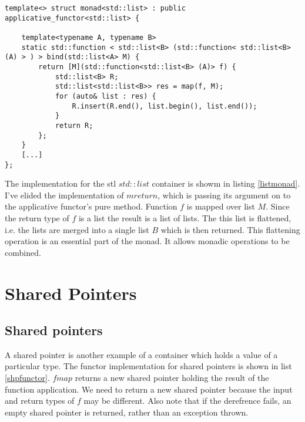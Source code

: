 \documentclass[12pt,fleqn]{article}
\begin{document}
  
%
%
%
\begin{minipage}{\linewidth}
\begin{lstlisting}[caption=monad for std::list, label=listmonad]
template<> struct monad<std::list> : public applicative_functor<std::list> {

	template<typename A, typename B>
	static std::function < std::list<B> (std::function< std::list<B> (A) > ) > bind(std::list<A> M) {
		return [M](std::function<std::list<B> (A)> f) {
			std::list<B> R;
			std::list<std::list<B>> res = map(f, M);
			for (auto& list : res) {
				R.insert(R.end(), list.begin(), list.end());
			}
			return R;
		};
	}
    [...]
};
\end{lstlisting}
\end{minipage}
%
%
%
The implementation for the stl $std::list$ container is showm in listing \ref{listmonad}.
I've elided the implementation of $mreturn$, which is passing its argument on to the applicative functor's pure method.
Function $f$ is mapped over list $M$. Since the return type of $f$ is a list the result is a list of lists.
The this list is flattened, i.e. the lists are merged into a single list $B$ which is then returned.
This flattening operation is an essential part of the monad. It allows monadic operations to be combined.

\section{Shared Pointers}

  

\subsection{Shared pointers}
%
%
%

A shared pointer is another example of a container which holds a value of a particular type.
The functor implementation for shared pointers is shown in list \ref{shpfunctor}. 
$fmap$ returns a new shared pointer holding the result of the function application.
We need to return a new shared pointer because the input and return types of $f$ may be different. 
Also note that if the derefrence fails, an empty shared pointer is returned, rather than an exception thrown.
\end{document}
